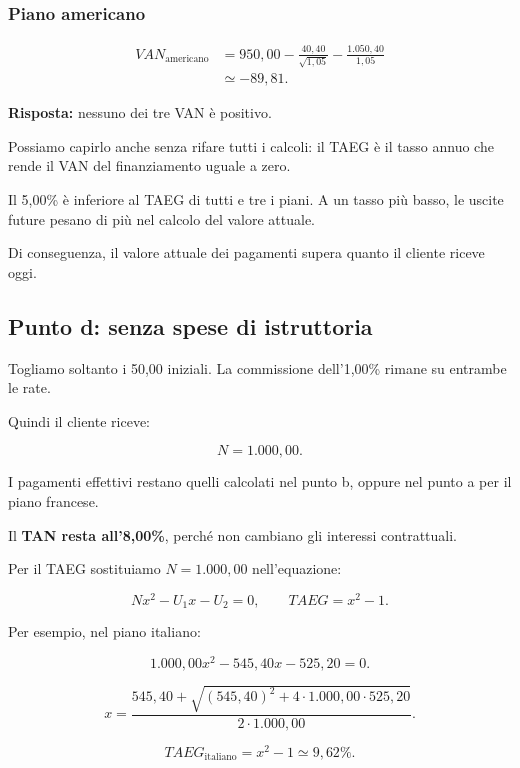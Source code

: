 \subsubsection*{Piano americano}

\[
\begin{aligned}
VAN_{\text{americano}}
&=
950{,}00
-\frac{40{,}40}{\sqrt{1{,}05}}
-\frac{1.050{,}40}{1{,}05}\\
&\simeq\boxed{-89{,}81}.
\end{aligned}
\]

\noindent \textbf{Risposta:}
nessuno dei tre VAN è positivo.

\noindent Possiamo capirlo anche
senza rifare tutti i calcoli:
il TAEG è il tasso annuo che rende
il VAN del finanziamento uguale a zero.

\noindent Il 5,00\% è inferiore
al TAEG di tutti e tre i piani.
A un tasso più basso,
le uscite future pesano di più
nel calcolo del valore attuale.

\noindent Di conseguenza,
il valore attuale dei pagamenti
supera quanto il cliente riceve oggi.


\subsection*{Punto d: senza spese di istruttoria}

\noindent Togliamo soltanto i 50,00 iniziali.
La commissione dell'1,00\%
rimane su entrambe le rate.

\noindent Quindi il cliente riceve:

\[
N=1.000{,}00.
\]

\noindent I pagamenti effettivi restano
quelli calcolati nel punto b,
oppure nel punto a per il piano francese.

\noindent Il \textbf{TAN resta all'8,00\%},
perché non cambiano
gli interessi contrattuali.

\medskip

\noindent Per il TAEG sostituiamo
$N=1.000{,}00$ nell'equazione:

\[
Nx^2-U_1x-U_2=0,
\qquad
TAEG=x^2-1.
\]

\noindent Per esempio, nel piano italiano:

\[
1.000{,}00x^2-545{,}40x-525{,}20=0.
\]

\[
x=
\frac{
545{,}40+
\sqrt{(545{,}40)^2+4\cdot1.000{,}00\cdot525{,}20}
}{
2\cdot1.000{,}00
}.
\]

\[
TAEG_{\text{italiano}}
=x^2-1
\simeq\boxed{9{,}62\%}.
\]


